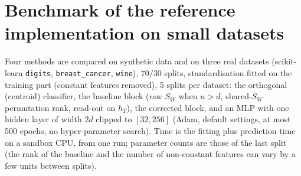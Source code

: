 \documentclass[11pt,a4paper]{article}
\theoremstyle{plain}
\theoremstyle{definition}
\theoremstyle{remark}
\begin{document}
\section{Benchmark of the reference implementation on small datasets}
\label{sec:bench}
Four methods are compared on synthetic data and on three real datasets
(scikit-learn \texttt{digits}, \texttt{breast\_cancer}, \texttt{wine}),
$70/30$ splits, standardisation fitted on the training part (constant
features removed), 5 splits per dataset: the orthogonal (centroid)
classifier, the baseline block (raw $S_W$ when $n>d$, shared-$S_W$
permutation rank, read-out on $h_T$), the corrected block, and an MLP with
one hidden layer of width $2d$ clipped to $[32,256]$ (Adam, default
settings, at most 500 epochs, no hyper-parameter search). Time is the
fitting plus prediction time on a sandbox CPU, from one run; parameter
counts are those of the last split (the rank of the baseline and the number
of non-constant features can vary by a few units between splits).
\end{document}
